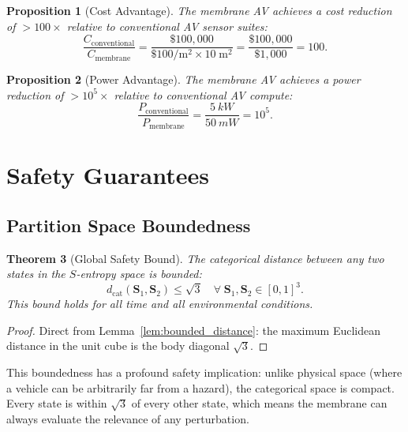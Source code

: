 \documentclass[twocolumn,10pt]{article}
\newtheorem{theorem}{Theorem}[section]
\newtheorem{proposition}[theorem]{Proposition}
\theoremstyle{definition}
\theoremstyle{remark}
\newcommand{\dcat}{d_{\mathrm{cat}}}
\begin{document}
\begin{proposition}[Cost Advantage]
\label{prop:cost}
The membrane AV achieves a cost reduction of $> 100\times$ relative to conventional AV sensor suites:
\begin{equation}
  \frac{C_{\mathrm{conventional}}}{C_{\mathrm{membrane}}} = \frac{\$100{,}000}{\$100/\mathrm{m}^2 \times 10\;\mathrm{m}^2} = \frac{\$100{,}000}{\$1{,}000} = 100.
  \label{eq:cost_ratio}
\end{equation}
\end{proposition}

\begin{proposition}[Power Advantage]
\label{prop:power}
The membrane AV achieves a power reduction of $> 10^5\times$ relative to conventional AV compute:
\begin{equation}
  \frac{P_{\mathrm{conventional}}}{P_{\mathrm{membrane}}} = \frac{\SI{5}{kW}}{\SI{50}{mW}} = 10^5.
  \label{eq:power_ratio}
\end{equation}
\end{proposition}


\section{Safety Guarantees}
\label{sec:safety}

\subsection{Partition Space Boundedness}

\begin{theorem}[Global Safety Bound]
\label{thm:global_safety}
The categorical distance between any two states in the $S$-entropy space is bounded:
\begin{equation}
  \dcat(\mathbf{S}_1, \mathbf{S}_2) \leq \sqrt{3} \quad \forall\; \mathbf{S}_1, \mathbf{S}_2 \in [0,1]^3.
  \label{eq:global_safety}
\end{equation}
This bound holds for all time and all environmental conditions.
\end{theorem}

\begin{proof}
Direct from Lemma~\ref{lem:bounded_distance}: the maximum Euclidean distance in the unit cube is the body diagonal $\sqrt{3}$.
\end{proof}

This boundedness has a profound safety implication: unlike physical space (where a vehicle can be arbitrarily far from a hazard), the categorical space is compact. Every state is within $\sqrt{3}$ of every other state, which means the membrane can always evaluate the relevance of any perturbation.
\end{document}
